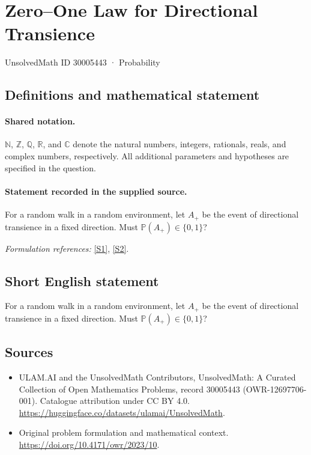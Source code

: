 \documentclass[11pt]{article}
\newcommand{\sref}[2]{\hyperlink{source:#1:#2}{[S#2]}}
\begin{document}
\setcounter{section}{30005442}
\section{Zero–One Law for Directional Transience}\label{30005443}
{\small UnsolvedMath ID 30005443 · Probability}
\subsection{Definitions and mathematical statement}

\paragraph{Shared notation.}$\mathbb N$, $\mathbb Z$, $\mathbb Q$, $\mathbb R$, and $\mathbb C$ denote the natural numbers, integers, rationals, reals, and complex numbers, respectively. All additional parameters and hypotheses are specified in the question.


\paragraph{Statement recorded in the supplied source.}
For a random walk in a random environment, let $A_+$ be the event of directional transience in a fixed direction. Must $\mathbb P(A_+)\in\{0,1\}$?
\par\smallskip\textit{Formulation references:} \sref{30005443}{1}, \sref{30005443}{2}.
\subsection{Short English statement}
For a random walk in a random environment, let $A_+$ be the event of directional transience in a fixed direction. Must $\mathbb P(A_+)\in\{0,1\}$?
\subsection{Sources}
\begin{itemize}
\item[\hypertarget{source:30005443:1}{S1}] ULAM.AI and the UnsolvedMath Contributors, UnsolvedMath: A Curated Collection of Open Mathematics Problems, record 30005443 (OWR-12697706-001). Catalogue attribution under CC BY 4.0.
\url{https://huggingface.co/datasets/ulamai/UnsolvedMath}.
\item[\hypertarget{source:30005443:2}{S2}] Original problem formulation and mathematical context.
\url{https://doi.org/10.4171/owr/2023/10}.
\end{itemize}
\label{end:30005443}
\end{document}

